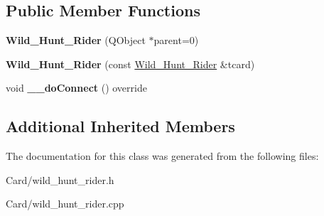 \subsection*{Public Member Functions}
\begin{DoxyCompactItemize}
\item 
\mbox{\label{class_wild___hunt___rider_a46ade4871788938ff27604a08649702d}} 
{\bfseries Wild\+\_\+\+Hunt\+\_\+\+Rider} (Q\+Object $\ast$parent=0)
\item 
\mbox{\label{class_wild___hunt___rider_a5818a71e04515fc0f4b0c7da1e561b93}} 
{\bfseries Wild\+\_\+\+Hunt\+\_\+\+Rider} (const \hyperlink{class_wild___hunt___rider}{Wild\+\_\+\+Hunt\+\_\+\+Rider} \&tcard)
\item 
\mbox{\label{class_wild___hunt___rider_a41091ed9ccfdfab959f67c55f934432e}} 
void {\bfseries \+\_\+\+\_\+do\+Connect} () override
\end{DoxyCompactItemize}
\subsection*{Additional Inherited Members}


The documentation for this class was generated from the following files\+:\begin{DoxyCompactItemize}
\item 
Card/wild\+\_\+hunt\+\_\+rider.\+h\item 
Card/wild\+\_\+hunt\+\_\+rider.\+cpp\end{DoxyCompactItemize}
